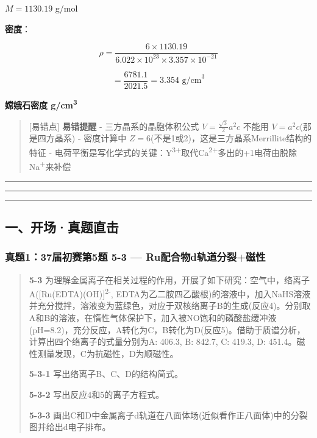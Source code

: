 \(M = 1130.19\) g/mol

\textbf{密度}：

\[\rho = \frac{6 \times 1130.19}{6.022 \times 10^{23} \times 3.357 \times 10^{-21}}\]

\[= \frac{6781.1}{2021.5} = 3.354 \text{ g/cm}^3\]

\textbf{嫦娥石密度  g/cm\textsuperscript{3}}

\begin{quote}
{[}易错点{]} \textbf{易错提醒}
- 三方晶系的晶胞体积公式 \(V = \frac{\sqrt{3}}{2}a^2c\) 不能用 \(V = a^2c\)(那是四方晶系)
- 密度计算中 \(Z = 6\)(不是1或2)，这是三方晶系Merrillite结构的特征
- 电荷平衡是写化学式的关键：Y\textsuperscript{3+}取代Ca\textsuperscript{2+}多出的+1电荷由脱除Na\textsuperscript{+}来补偿
\end{quote}

\begin{center}\rule{0.5\linewidth}{0.5pt}\end{center}

\begin{center}\rule{0.5\linewidth}{0.5pt}\end{center}

\begin{center}\rule{0.5\linewidth}{0.5pt}\end{center}

\subsection{一、开场·真题直击}\label{ux4e00ux5f00ux573aux771fux9898ux76f4ux51fb-4}

\subsubsection{真题1：37届初赛第5题 5-3 --- Ru配合物d轨道分裂+磁性}\label{ux771fux9898137ux5c4aux521dux8d5bux7b2c5ux9898-5-3-ruux914dux5408ux7269dux8f68ux9053ux5206ux88c2ux78c1ux6027}

\begin{quote}
\textbf{5-3} 为理解金属离子在相关过程的作用，开展了如下研究：空气中，络离子A({[}Ru(EDTA)(OH){]}\textsuperscript{2-}, EDTA为乙二胺四乙酸根)的溶液中，加入NaHS溶液并充分搅拌，溶液变为蓝绿色，对应于双核络离子B的生成(反应4)。分别取A和B的溶液，在惰性气体保护下，加入被NO饱和的磷酸盐缓冲液(pH=8.2)，充分反应，A转化为C，B转化为D(反应5)。借助于质谱分析，计算出四个络离子的式量分别为A: 406.3, B: 842.7, C: 419.3, D: 451.4。磁性测量发现，C为抗磁性，D为顺磁性。

\textbf{5-3-1} 写出络离子B、C、D的结构简式。

\textbf{5-3-2} 写出反应4和5的离子方程式。

\textbf{5-3-3} 画出C和D中金属离子d轨道在八面体场(近似看作正八面体)中的分裂图并给出d电子排布。
\end{quote}

